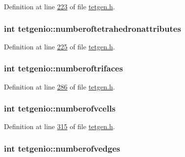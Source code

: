 Definition at line \hyperlink{tetgen_8h_source_l00223}{223} of file \hyperlink{tetgen_8h_source}{tetgen.\+h}.

\subsubsection[{\texorpdfstring{numberoftetrahedronattributes}{numberoftetrahedronattributes}}]{\setlength{\rightskip}{0pt plus 5cm}int tetgenio\+::numberoftetrahedronattributes}\hypertarget{classtetgenio_ac22e481bf9a3662b173599914a696f7a}{}\label{classtetgenio_ac22e481bf9a3662b173599914a696f7a}


Definition at line \hyperlink{tetgen_8h_source_l00225}{225} of file \hyperlink{tetgen_8h_source}{tetgen.\+h}.

\subsubsection[{\texorpdfstring{numberoftrifaces}{numberoftrifaces}}]{\setlength{\rightskip}{0pt plus 5cm}int tetgenio\+::numberoftrifaces}\hypertarget{classtetgenio_aba0186083c61eb48fca7e80b4a3158f2}{}\label{classtetgenio_aba0186083c61eb48fca7e80b4a3158f2}


Definition at line \hyperlink{tetgen_8h_source_l00286}{286} of file \hyperlink{tetgen_8h_source}{tetgen.\+h}.

\subsubsection[{\texorpdfstring{numberofvcells}{numberofvcells}}]{\setlength{\rightskip}{0pt plus 5cm}int tetgenio\+::numberofvcells}\hypertarget{classtetgenio_afbc917d5c352817d0668170f71bb8404}{}\label{classtetgenio_afbc917d5c352817d0668170f71bb8404}


Definition at line \hyperlink{tetgen_8h_source_l00315}{315} of file \hyperlink{tetgen_8h_source}{tetgen.\+h}.

\subsubsection[{\texorpdfstring{numberofvedges}{numberofvedges}}]{\setlength{\rightskip}{0pt plus 5cm}int tetgenio\+::numberofvedges}\hypertarget{classtetgenio_a4c8ba7851351b7f70e3ef837e2900f74}{}\label{classtetgenio_a4c8ba7851351b7f70e3ef837e2900f74}


